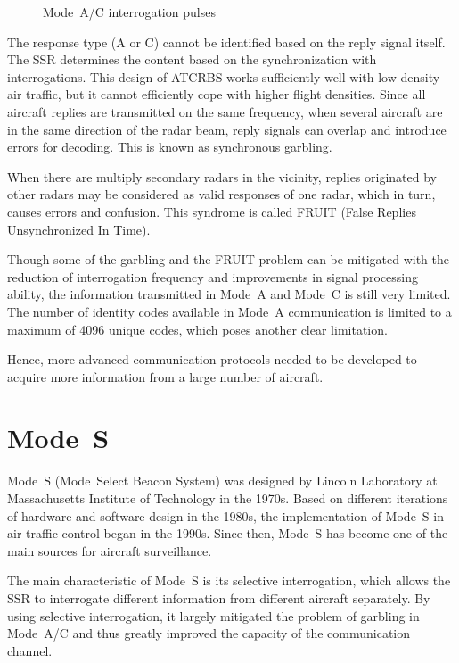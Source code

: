 \begin{figure}[ht]
  \scalebox{0.9}{
    
  }
  \caption{Mode~A/C interrogation pulses}
  \label{fig:mode_ac_downlink_pulses}
\end{figure}

The response type (A or C) cannot be identified based on the reply signal itself. The SSR determines the content based on the synchronization with interrogations. This design of ATCRBS works sufficiently well with low-density air traffic, but it cannot efficiently cope with higher flight densities. Since all aircraft replies are transmitted on the same frequency, when several aircraft are in the same direction of the radar beam, reply signals can overlap and introduce errors for decoding. This is known as synchronous garbling.

When there are multiply secondary radars in the vicinity, replies originated by other radars may be considered as valid responses of one radar, which in turn, causes errors and confusion. This syndrome is called FRUIT (False Replies Unsynchronized In Time).

Though some of the garbling and the FRUIT problem can be mitigated with the reduction of interrogation frequency and improvements in signal processing ability, the information transmitted in Mode~A and Mode~C is still very limited. The number of identity codes available in Mode~A communication is limited to a maximum of 4096 unique codes, which poses another clear limitation.

Hence, more advanced communication protocols needed to be developed to acquire more information from a large number of aircraft.



\section{Mode~S}

Mode~S (Mode~Select Beacon System) was designed by Lincoln Laboratory at Massachusetts Institute of Technology in the 1970s. Based on different iterations of hardware and software design in the 1980s, the implementation of Mode~S in air traffic control began in the 1990s. Since then, Mode~S has become one of the main sources for aircraft surveillance.

The main characteristic of Mode~S is its selective interrogation, which allows the SSR to interrogate different information from different aircraft separately. By using selective interrogation, it largely mitigated the problem of garbling in Mode~A/C and thus greatly improved the capacity of the communication channel.

